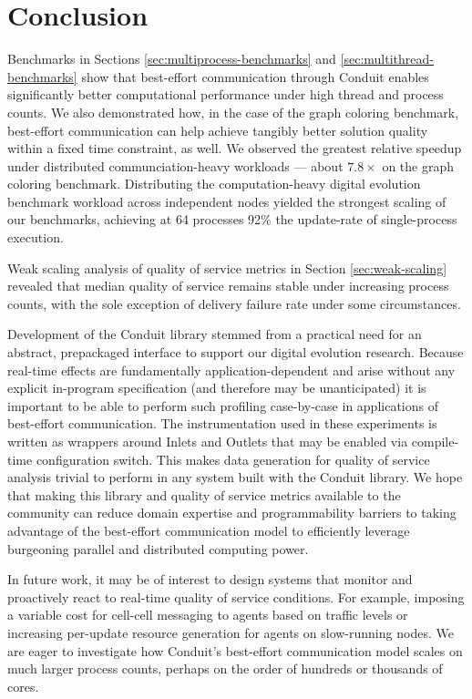 \section{Conclusion}

Benchmarks in Sections \ref{sec:multiprocess-benchmarks} and \ref{sec:multithread-benchmarks} show that best-effort communication through Conduit enables significantly better computational performance under high thread and process counts.
We also demonstrated how, in the case of the graph coloring benchmark, best-effort communication can help achieve tangibly better solution quality within a fixed time constraint, as well.
We observed the greatest relative speedup under distributed communciation-heavy workloads --- about $7.8\times$ on the graph coloring benchmark.
Distributing the computation-heavy digital evolution benchmark workload across independent nodes yielded the strongest scaling of our benchmarks, achieving at 64 processes 92\% the update-rate of single-process execution.

Weak scaling analysis of quality of service metrics in Section \ref{sec:weak-scaling} revealed that median quality of service remains stable under increasing process counts, with the sole exception of delivery failure rate under some circumstances.

Development of the Conduit library stemmed from a practical need for an abstract, prepackaged interface to support our digital evolution research.
Because real-time effects are fundamentally application-dependent and arise without any explicit in-program specification (and therefore may be unanticipated) it is important to be able to perform such profiling case-by-case in applications of best-effort communication.
The instrumentation used in these experiments is written as wrappers around Inlets and Outlets that may be enabled via compile-time configuration switch.
This makes data generation for quality of service analysis trivial to perform in any system built with the Conduit library.
We hope that making this library and quality of service metrics available to the community can reduce domain expertise and programmability barriers to taking advantage of the best-effort communication model to efficiently leverage burgeoning parallel and distributed computing power.

In future work, it may be of interest to design systems that monitor and proactively react to real-time quality of service conditions.
For example, imposing a variable cost for cell-cell messaging to agents based on traffic levels or increasing per-update resource generation for agents on slow-running nodes.
We are eager to investigate how Conduit's best-effort communication model scales on much larger process counts, perhaps on the order of hundreds or thousands of cores.
